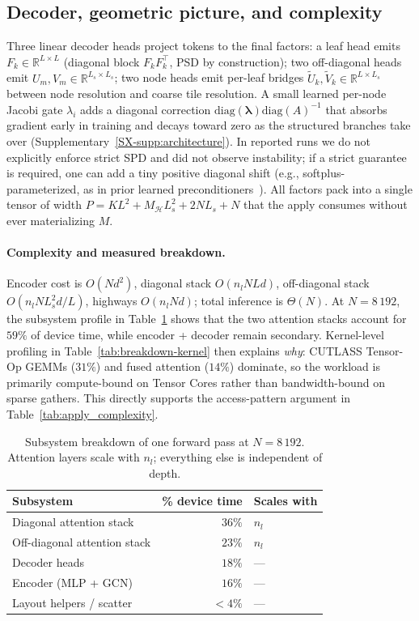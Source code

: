 \documentclass[acmtog]{acmart}
\theoremstyle{plain}
\begin{document}
\subsection{Decoder, geometric picture, and complexity}
\label{sec:method:decoder}
Three linear decoder heads project tokens to the final factors: a leaf head emits
$F_k\!\in\!\mathbb{R}^{L\times L}$ (diagonal block $F_kF_k^\top$, PSD by construction);
two off-diagonal heads emit $U_m, V_m\!\in\!\mathbb{R}^{L_s\times L_s}$; two node heads
emit per-leaf bridges $\tilde U_k, \tilde V_k\!\in\!\mathbb{R}^{L\times L_s}$ between
node resolution and coarse tile resolution. A small learned per-node Jacobi gate
$\lambda_i$ adds a diagonal correction $\mathrm{diag}(\boldsymbol\lambda)\mathrm{diag}(A)^{-1}$
that absorbs gradient early in training and decays toward zero as the structured
branches take over (Supplementary~\ref{SX-supp:architecture}). In reported runs we do
not explicitly enforce strict SPD and did not observe instability; if a strict guarantee
is required, one can add a tiny positive diagonal shift (e.g., softplus-parameterized,
as in prior learned preconditioners~\cite{Yang2025sparse}). All factors pack into a
single tensor of width $P\!=\!KL^2+M_{\mathcal{H}}L_s^2+2NL_s+N$ that the apply consumes
without ever materializing $M$.

\paragraph{Complexity and measured breakdown.}
Encoder cost is $O(Nd^2)$, diagonal stack $O(n_lNLd)$, off-diagonal stack
$O(n_lNL_s^2d/L)$, highways $O(n_lNd)$; total inference is $\Theta(N)$. At
$N\!=\!8\,192$, the subsystem profile in Table~\ref{tab:breakdown-subsystem} shows that
the two attention stacks account for $59\%$ of device time, while encoder + decoder remain
secondary. Kernel-level profiling in Table~\ref{tab:breakdown-kernel} then explains
\emph{why}: CUTLASS Tensor-Op GEMMs ($31\%$) and fused attention ($14\%$) dominate, so the
workload is primarily compute-bound on Tensor Cores rather than bandwidth-bound on sparse
gathers. This directly supports the access-pattern argument in
Table~\ref{tab:apply_complexity}.

\begin{table}[t]
\centering
\caption{Subsystem breakdown of one forward pass at $N\!=\!8\,192$. Attention layers
scale with $n_l$; everything else is independent of depth.}
\label{tab:breakdown-subsystem}
\footnotesize\setlength{\tabcolsep}{4pt}
\begin{tabular}{@{}lrl@{}}
\toprule
Subsystem & \% device time & Scales with \\
\midrule
Diagonal attention stack     & $36\%$ & $n_l$ \\
Off-diagonal attention stack & $23\%$ & $n_l$ \\
Decoder heads                & $18\%$ & --- \\
Encoder (MLP + GCN)          & $16\%$ & --- \\
Layout helpers / scatter     & $<\!4\%$ & --- \\
\bottomrule
\end{tabular}
\end{table}
\end{document}
